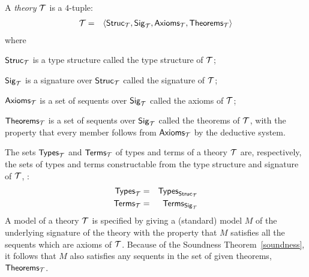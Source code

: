 A \HOL{} {\it theory\/} ${\cal T}$ is a $4$-tuple:
\begin{eqnarray*}
{\cal T} & = & \langle{\sf Struc}_{\cal T},{\sf Sig}_{\cal T},
               {\sf Axioms}_{\cal T},{\sf Theorems}_{\cal T}\rangle
\end{eqnarray*}
where
\begin{myenumerate}

\item ${\sf Struc}_{\cal T}$ is a type structure  called the type
structure of ${\cal T}$;

\item ${\sf Sig}_{\cal T}$ is a signature
over ${\sf Struc}_{\cal T}$ called the signature of ${\cal T}$;

\item ${\sf Axioms}_{\cal T}$ is a set of sequents over ${\sf Sig}_{\cal T}$
called the  axioms
 of  ${\cal T}$;

\item ${\sf Theorems}_{\cal T}$ is a set of sequents over
${\sf Sig}_{\cal T}$ called the theorems
%
%
of ${\cal T}$, with
the property that every member follows from ${\sf Axioms}_{\cal T}$ by
the \HOL{} deductive system.

\end{myenumerate}

The sets ${\sf Types}_{\cal T}$ and ${\sf Terms}_{\cal T}$ of types and
terms of a theory ${\cal T}$ are, respectively, the sets of types and
terms constructable from the type structure and signature of ${\cal
T}$, \ie:
\begin{eqnarray*}
{\sf Types}_{\cal T} & = & {\sf Types}_{{\sf Struc}_{\cal T}}\\
{\sf Terms}_{\cal T} & = & {\sf Terms}_{{\sf Sig}_{\cal T}}
\end{eqnarray*}
A model of a theory $\cal T$ is specified by giving a (standard) model
$M$ of the underlying signature of the theory with the property that
$M$ satisfies all the sequents which are axioms of $\cal T$.  Because
of the Soundness Theorem~\ref{soundness}, it follows that $M$ also
satisfies any sequents in the set of given  theorems, ${\sf
Theorems}_{\cal T}$.

